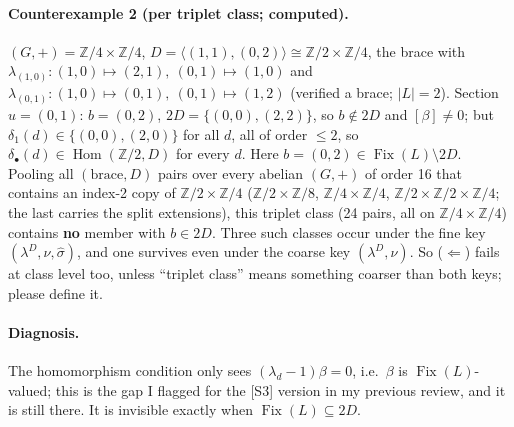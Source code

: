 \documentclass[11pt]{article}
\newcommand{\Z}{\mathbb{Z}}
\newcommand{\Fix}{\operatorname{Fix}}
\newcommand{\Hom}{\operatorname{Hom}}
\newcommand{\sh}{\hat\sigma}
\begin{document}
\paragraph{Counterexample 2 (per triplet class; computed).} $(G,+)=\Z/4\times\Z/4$,
$D=\langle(1,1),(0,2)\rangle\cong\Z/2\times\Z/4$, the brace with
$\lambda_{(1,0)}:(1,0)\mapsto(2,1),\ (0,1)\mapsto(1,0)$ and
$\lambda_{(0,1)}:(1,0)\mapsto(0,1),\ (0,1)\mapsto(1,2)$ (verified a brace; $|L|=2$).
Section $u=(0,1)$: $b=(0,2)$, $2D=\{(0,0),(2,2)\}$, so $b\notin2D$ and $[\beta]\neq0$; but
$\delta_1(d)\in\{(0,0),(2,0)\}$ for all $d$, all of order $\le2$, so
$\delta_\bullet(d)\in\Hom(\Z/2,D)$ for every $d$. Here $b=(0,2)\in\Fix(L)\setminus 2D$.
Pooling all $(\text{brace},D)$ pairs over every abelian $(G,+)$ of order 16 that contains an
index-2 copy of $\Z/2\times\Z/4$ ($\Z/2\times\Z/8$, $\Z/4\times\Z/4$, $\Z/2\times\Z/2\times\Z/4$;
the last carries the split extensions), this triplet class (24 pairs, all on
$\Z/4\times\Z/4$) contains \textbf{no} member with $b\in 2D$. Three such classes occur
under the fine key $(\lambda^D,\nu,\sh)$, and one survives even under the coarse key
$(\lambda^D,\nu)$. So ($\Leftarrow$) fails at class level too, unless ``triplet class''
means something coarser than both keys; please define it.

\paragraph{Diagnosis.} The homomorphism condition only sees $(\lambda_d-1)\beta=0$, i.e.\
$\beta$ is $\Fix(L)$-valued; this is the gap I flagged for the [S3] version in my previous
review, and it is still there. It is invisible exactly when $\Fix(L)\subseteq2D$.
\end{document}
